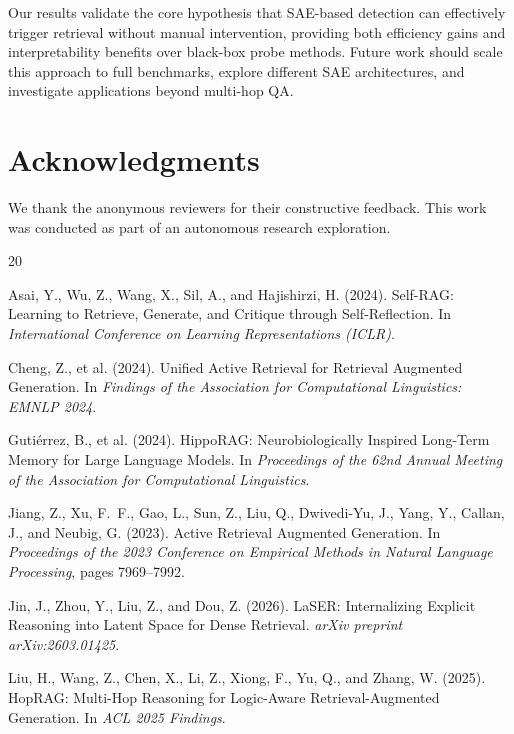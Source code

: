 \documentclass{article}
\begin{document}
Our results validate the core hypothesis that SAE-based detection can effectively trigger retrieval without manual intervention, providing both efficiency gains and interpretability benefits over black-box probe methods. Future work should scale this approach to full benchmarks, explore different SAE architectures, and investigate applications beyond multi-hop QA.

\section*{Acknowledgments}

We thank the anonymous reviewers for their constructive feedback. This work was conducted as part of an autonomous research exploration.

\begin{thebibliography}{20}

Asai, Y., Wu, Z., Wang, X., Sil, A., and Hajishirzi, H. (2024).
Self-RAG: Learning to Retrieve, Generate, and Critique through Self-Reflection.
In \textit{International Conference on Learning Representations (ICLR)}.

Cheng, Z., et al. (2024).
Unified Active Retrieval for Retrieval Augmented Generation.
In \textit{Findings of the Association for Computational Linguistics: EMNLP 2024}.

Guti{\'e}rrez, B., et al. (2024).
HippoRAG: Neurobiologically Inspired Long-Term Memory for Large Language Models.
In \textit{Proceedings of the 62nd Annual Meeting of the Association for Computational Linguistics}.

Jiang, Z., Xu, F.~F., Gao, L., Sun, Z., Liu, Q., Dwivedi-Yu, J., Yang, Y., Callan, J., and Neubig, G. (2023).
Active Retrieval Augmented Generation.
In \textit{Proceedings of the 2023 Conference on Empirical Methods in Natural Language Processing}, pages 7969--7992.

Jin, J., Zhou, Y., Liu, Z., and Dou, Z. (2026).
LaSER: Internalizing Explicit Reasoning into Latent Space for Dense Retrieval.
\textit{arXiv preprint arXiv:2603.01425}.

Liu, H., Wang, Z., Chen, X., Li, Z., Xiong, F., Yu, Q., and Zhang, W. (2025).
HopRAG: Multi-Hop Reasoning for Logic-Aware Retrieval-Augmented Generation.
In \textit{ACL 2025 Findings}.


\end{thebibliography}
\end{document}
